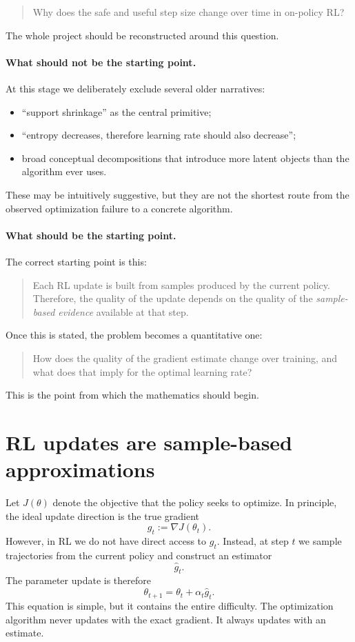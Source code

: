 \documentclass[11pt]{article}
\begin{document}
\begin{quote}
Why does the safe and useful step size change over time in on-policy RL?
\end{quote}

The whole project should be reconstructed around this question.

\paragraph{What should not be the starting point.}
At this stage we deliberately exclude several older narratives:
\begin{itemize}
    \item ``support shrinkage'' as the central primitive;
    \item ``entropy decreases, therefore learning rate should also decrease'';
    \item broad conceptual decompositions that introduce more latent objects than the algorithm ever uses.
\end{itemize}
These may be intuitively suggestive, but they are not the shortest route from the observed optimization failure to a concrete algorithm.

\paragraph{What should be the starting point.}
The correct starting point is this:
\begin{quote}
Each RL update is built from samples produced by the current policy. Therefore, the quality of the update depends on the quality of the \emph{sample-based evidence} available at that step.
\end{quote}

Once this is stated, the problem becomes a quantitative one:
\begin{quote}
How does the quality of the gradient estimate change over training, and what does that imply for the optimal learning rate?
\end{quote}

This is the point from which the mathematics should begin.

\section{RL updates are sample-based approximations}

Let $J(\theta)$ denote the objective that the policy seeks to optimize. In principle, the ideal update direction is the true gradient
\[
g_t := \nabla J(\theta_t).
\]
However, in RL we do not have direct access to $g_t$. Instead, at step $t$ we sample trajectories from the current policy and construct an estimator
\[
\hat g_t.
\]
The parameter update is therefore
\[
\theta_{t+1} = \theta_t + \alpha_t \hat g_t.
\]
This equation is simple, but it contains the entire difficulty. The optimization algorithm never updates with the exact gradient. It always updates with an estimate.
\end{document}
